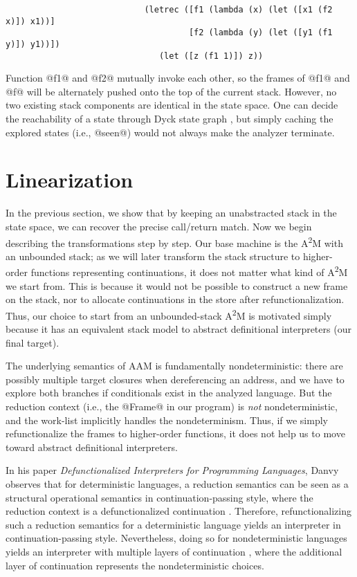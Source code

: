 \documentclass[acmsmall, screen]{acmart}\settopmatter{}
\begin{document}
\begin{lstlisting}
                            (letrec ([f1 (lambda (x) (let ([x1 (f2 x)]) x1))]
                                     [f2 (lambda (y) (let ([y1 (f1 y)]) y1))])
                               (let ([z (f1 1)]) z))
\end{lstlisting}

Function @f1@ and @f2@ mutually invoke each other, so the frames of @f1@ and @f@ will be
alternately pushed onto the top of the current stack. However, no two existing stack
components are identical in the state space. One can decide the reachability of a state
through Dyck state graph \cite{earl2010pushdown, earl2012introspective}, but simply
caching the explored states (i.e., @seen@) would not always make the analyzer terminate.


\section{Linearization} \label{linear}

In the previous section, we show that by keeping an unabstracted stack in the state
space, we can recover the precise call/return match. Now we begin describing the
transformations step by step. Our base machine is the A\textsuperscript{2}M with an unbounded
stack; as we will later transform the stack structure to higher-order functions
representing continuations, it does not matter what kind of A\textsuperscript{2}M we start from.
This is because it would not be possible to construct a new frame on the stack, nor
to allocate continuations in the store after refunctionalization.
Thus, our choice to start from an unbounded-stack A\textsuperscript{2}M is motivated simply because
it has an equivalent stack model to abstract definitional interpreters (our final target).

The underlying semantics of AAM is fundamentally nondeterministic: there are possibly
multiple target closures when dereferencing an address, and we have to explore both branches
if conditionals exist in the analyzed language. But the reduction context (i.e., the @Frame@ in
our program) is \emph{not} nondeterministic, and the work-list implicitly
handles the nondeterminism. Thus, if we simply refunctionalize the frames to higher-order
functions, it does not help us to move toward abstract definitional interpreters.

In his paper \textit{Defunctionalized Interpreters for Programming Languages},
Danvy observes that for deterministic languages, a reduction semantics can be seen as
a structural operational semantics in continuation-passing style, where the reduction context is
a defunctionalized continuation \cite{Danvy:2008:DIP:1411204.1411206}. Therefore,
refunctionalizing such a reduction semantics for a deterministic language yields
an interpreter in continuation-passing style.
Nevertheless, doing so for nondeterministic languages yields an interpreter
with multiple layers of continuation \cite{Danvy:2006:RW:2171265.2171268, DANVY2009534},
where the additional layer of continuation represents the nondeterministic choices.
\end{document}
